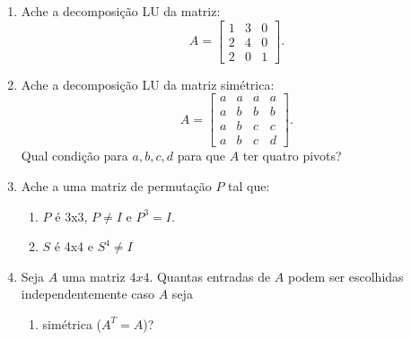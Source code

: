 \documentclass[leqno]{article}
\numberwithin{equation}{section}
\begin{document}
\begin{enumerate}

\item Ache a decomposição LU da matriz:
$$A = \begin{bmatrix} 1 & 3 & 0  \\
2 & 4 & 0  \\
2 & 0 & 1 
\end{bmatrix}.$$

\begin{sol} 
\end{sol} 

\item Ache a decomposição LU da matriz simétrica:
$$A = \begin{bmatrix} a & a & a & a  \\
a & b & b & b  \\
a & b & c & c  \\
a & b & c & d 
\end{bmatrix}.$$
Qual condição para $a,b,c,d$ para que $A$ ter quatro pivots?

\begin{sol} 
\end{sol} 

\item Ache a uma matriz de permutação $P$ tal que:

\begin{enumerate}

\item $P$ é 3x3, $P \neq I$ e $P^3 = I$.

\begin{sol} 
\end{sol} 

\item $S$ é 4x4 e $S^4 \neq I$

\begin{sol} 
\end{sol} 

\end{enumerate}

\item Seja $A$ uma matriz $4x4$. Quantas entradas de $A$ podem ser escolhidas independentemente caso $A$ seja

\begin{enumerate}

\item simétrica ($A^T = A$)?


\end{enumerate}
\end{enumerate}
\end{document}
